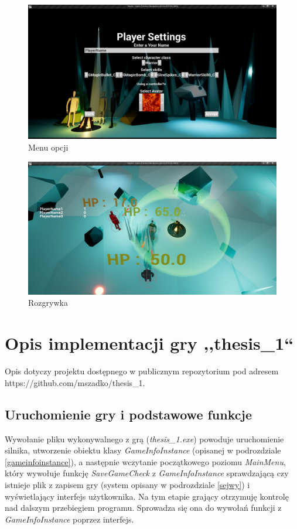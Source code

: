 \documentclass[multip]{SGGW-thesis}
\begin{document}
\begin{figure}
	\centering
		\includegraphics[width=1\textwidth]{figures/settingsmenu.jpg}
	\caption{Menu opcji}
	\label{settingsmenu}
\end{figure}
\begin{figure}
	\centering
		\includegraphics[width=1\textwidth]{figures/gameplay1.jpg}
	\caption{Rozgrywka}
	\label{gameplay1}
\end{figure}
\chapter{Opis implementacji gry ,,thesis\_1``}
\label{implementacja}
Opis dotyczy projektu dostępnego w publicznym repozytorium pod adresem \newline https://github.com/mszadko/thesis\_1.

\section{Uruchomienie gry i podstawowe funkcje}
Wywołanie pliku wykonywalnego z grą ({\em thesis\_1.exe}) powoduje uruchomienie silnika, utworzenie obiektu klasy {\em GameInfoInstance} (opisanej w podrozdziale \ref{gameinfoinstance}), a następnie wczytanie początkowego poziomu {\em MainMenu}, który wywołuje funkcję {\em SaveGameCheck} z {\em GameInfoInstance} sprawdzającą czy istnieje plik z zapisem gry (system opisany w podrozdziale \ref{sejwy}) i wyświetlający interfejs użytkownika. Na tym etapie grający otrzymuję kontrolę nad dalszym przebiegiem programu. Sprowadza się ona do wywołań funkcji z {\em GameInfoInstance} poprzez interfejs.
\end{document}
